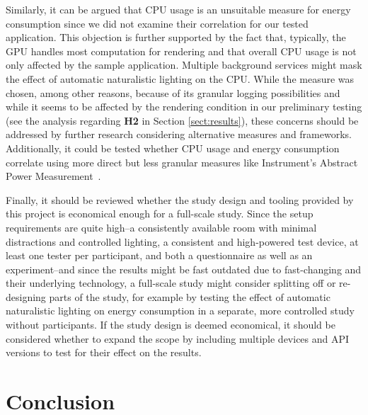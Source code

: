\documentclass[12pt,twoside,english]{article}
\begin{document}
Similarly, it can be argued that \gls{CPU} usage is an unsuitable measure for energy consumption since we did not examine their correlation for our tested application.
This objection is further supported by the fact that, typically, the \gls{GPU} handles most computation for rendering and that overall \gls{CPU} usage is not only affected by the sample application.
Multiple background services might mask the effect of automatic naturalistic lighting on the \gls{CPU}.
While the measure was chosen, among other reasons, because of its granular logging possibilities and while it seems to be affected by the rendering condition in our preliminary testing (see the analysis regarding \textbf{H2} in Section \ref{sect:results}), these concerns should be addressed by further research considering alternative measures and frameworks.
Additionally, it could be tested whether \gls{CPU} usage and energy consumption correlate using more direct but less granular measures like Instrument's Abstract Power Measurement~\cite{apple_abstract_2020}.

Finally, it should be reviewed whether the study design and tooling provided by this project is economical enough for a full-scale study.
Since the setup requirements are quite high--a consistently available room with minimal distractions and controlled lighting, a consistent and high-powered test device, at least one tester per participant, and both a questionnaire as well as an experiment--and since the results might be fast outdated due to fast-changing  and their underlying technology, a full-scale study might consider splitting off or re-designing parts of the study, for example by testing the effect of automatic naturalistic lighting on energy consumption in a separate, more controlled study without participants.
If the study design is deemed economical, it should be considered whether to expand the scope by including multiple devices and API versions to test for their effect on the results.

\section{Conclusion}
\label{sect:conclusion}
\end{document}
